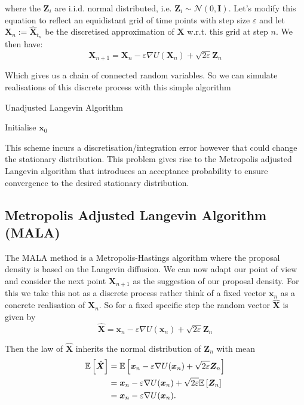 where the $\bm{Z}_i$ are i.i.d. normal distributed, i.e. $\bm{Z}_i \sim \mathcal{N}(0, \bm{I})$.
Let's modify this equation to reflect an equidistant grid of time points with step size $\varepsilon$ 
and let $\bm{X}_n := \hat{\bm{X}}_{t_n}$ be the discretised approximation of $\bm{X}$ w.r.t. this grid at step $n$. We then have:
\[
	\bm{X}_{n+1} = \bm{X}_n - \varepsilon \nabla U( \bm{X}_n ) + \sqrt{2 \varepsilon} \bm{Z}_n
\]

Which gives us a chain of connected random variables. So we can simulate realisations of this discrete process with this simple algorithm

\NoCaptionOfAlgo
\begin{algorithm}[H]
\SetAlgoLined
\DontPrintSemicolon
{}
\SetAlCapSkip{1em}
\SetAlCapNameFnt{\normalfont\normalsize}
\caption{Unadjusted Langevin Algorithm}

Initialise $\bm{x}_0$ \;

\end{algorithm}

This scheme incurs a discretisation/integration error however that could change the stationary distribution.
This problem gives rise to the Metropolis adjusted Langevin algorithm that introduces an acceptance probability to ensure convergence to the desired stationary distribution.


\subsection{Metropolis Adjusted Langevin Algorithm (MALA)}

The MALA method is a Metropolis-Hastings algorithm where the proposal density is based on the Langevin diffusion.
We can now adapt our point of view and consider the next point $\bm{X}_{n+1}$ as the suggestion of our proposal density.
For this we take this not as a discrete process rather think of a fixed vector $\bm{x}_n$ as a concrete realisation of $\bm{X}_n$. 
So for a fixed specific step the random vector $\hat{\bm{X}}$ is given by
\[
	\hat{\bm{X}} = \bm{x}_n - \varepsilon \nabla U( \bm{x}_n ) + \sqrt{2 \varepsilon} \bm{Z}_n
\]

Then the law of $\hat{\bm{X}}$ inherits the normal distribution of $\bm{Z}_n$ with mean
\[
\begin{aligned}
	\mathbb{E}\left[  \hat{\bm{X}}  \right] 
	&= \mathbb{E}\left[  \bm{x}_n - \varepsilon \nabla U( \bm{x}_n ) + \sqrt{2 \varepsilon} \bm{Z}_n  \right] \\
	&= \bm{x}_n - \varepsilon \nabla U( \bm{x}_n ) + \sqrt{2 \varepsilon} \mathbb{E}\left[  \bm{Z}_n  \right] \\
	&= \bm{x}_n - \varepsilon \nabla U( \bm{x}_n ) . \\
\end{aligned}
\]

